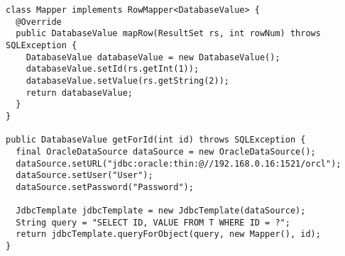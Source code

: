 

\begin{lstlisting}[caption={Example of loading data from Oracle database using Spring JDBC Framework}, label={code:jdbcTemplate}]
class Mapper implements RowMapper<DatabaseValue> {
  @Override
  public DatabaseValue mapRow(ResultSet rs, int rowNum) throws SQLException {
    DatabaseValue databaseValue = new DatabaseValue();
    databaseValue.setId(rs.getInt(1));
    databaseValue.setValue(rs.getString(2));
    return databaseValue;
  }
}

public DatabaseValue getForId(int id) throws SQLException {
  final OracleDataSource dataSource = new OracleDataSource();
  dataSource.setURL("jdbc:oracle:thin:@//192.168.0.16:1521/orcl");
  dataSource.setUser("User");
  dataSource.setPassword("Password");

  JdbcTemplate jdbcTemplate = new JdbcTemplate(dataSource);
  String query = "SELECT ID, VALUE FROM T WHERE ID = ?";
  return jdbcTemplate.queryForObject(query, new Mapper(), id);
}
\end{lstlisting}

